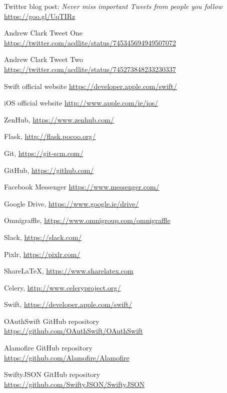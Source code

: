 \documentclass{article}
\begin{document}
\begin{thebibliography}{9}
    Twitter blog post: \textit{Never miss important Tweets from people you follow} \\
    \phantom{ } \url{https://goo.gl/UqTIRz}

    Andrew Clark Tweet One \\
    \phantom{ } \url{https://twitter.com/acdlite/status/745345694949507072}
    
    Andrew Clark Tweet Two \\
    \phantom{ } \url{https://twitter.com/acdlite/status/745273848233230337}
	
	Swift official website \url{https://developer.apple.com/swift/}
	
	iOS official website \url{http://www.apple.com/ie/ios/}
	
	ZenHub, \url{https://www.zenhub.com/}

    Flask, \url{http://flask.pocoo.org/}
    
    Git, \url{https://git-scm.com/}

    GitHub, \url{https://github.com/}

    Facebook Messenger \url{https://www.messenger.com/}

    Google Drive, \url{https://www.google.ie/drive/}

    Omnigraffle, \url{https://www.omnigroup.com/omnigraffle}

    Slack, \url{https://slack.com/}
    
    Pixlr, \url{https://pixlr.com/}
     
    ShareLaTeX, \url{https://www.sharelatex.com}
    
    Celery, \url{http://www.celeryproject.org/}

    Swift, \url{https://developer.apple.com/swift/}
    
    OAuthSwift GitHub repository \\
    \phantom{ } \url{https://github.com/OAuthSwift/OAuthSwift}
    
    Alamofire GitHub repository \\
    \phantom{ } \url{https://github.com/Alamofire/Alamofire}
    
    SwiftyJSON GitHub repository \\
    \phantom{ } \url{https://github.com/SwiftyJSON/SwiftyJSON}
    

\end{thebibliography}
\end{document}
